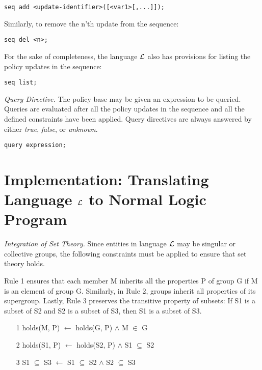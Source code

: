 \documentclass{llncs}
\begin{document}
    \begin{verbatim}seq add <update-identifier>([<var1>[,...]]);\end{verbatim}

    Similarly, to remove the n'th update from the sequence:

    \begin{verbatim}seq del <n>;\end{verbatim}

    For the sake of completeness, the language $\cal{L}$ also has provisions
    for listing the policy updates in the sequence:

    \begin{verbatim}seq list;\end{verbatim}

    \emph{Query Directive.} The policy base may be given an expression to be
    queried. Queries are evaluated after all the policy updates in the
    sequence and all the defined constraints have been applied. Query
    directives are always answered by either \emph{true}, \emph{false}, or
    \emph{unknown}.

    \begin{verbatim}query expression;\end{verbatim}

  \section{Implementation: Translating Language $\cal{L}$ to Normal Logic Program}

    \emph{Integration of Set Theory.} Since entities in language $\cal{L}$ may 
    be singular or collective groups, the following constraints must be applied
    to ensure that set theory holds.

    Rule 1 ensures that each member M inherits all the properties P of group G 
    if M is an element of group G. Similarly, in Rule 2, groups inherit all
    properties of its supergroup. Lastly, Rule 3 preserves the transitive
    property of subsets: If S1 is a subset of S2 and S2 is a subset of S3,
    then S1 is a subset of S3.

    \begin{enumerate}
      \item[1]
        holds(M, P) $\leftarrow$ holds(G, P) $\land$ M $\in$ G
      \item[2]
        holds(S1, P) $\leftarrow$ holds(S2, P) $\land$ S1 $\subseteq$ S2
      \item[3]
        S1 $\subseteq$ S3 $\leftarrow$ S1 $\subseteq$ S2 $\land$ S2
        $\subseteq$ S3
    \end{enumerate}
\end{document}
